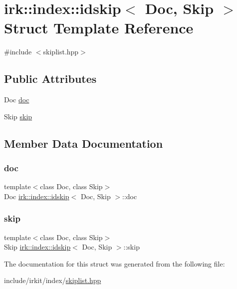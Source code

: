 \hypertarget{structirk_1_1index_1_1idskip}{}\section{irk\+:\+:index\+:\+:idskip$<$ Doc, Skip $>$ Struct Template Reference}
\label{structirk_1_1index_1_1idskip}


{\ttfamily \#include $<$skiplist.\+hpp$>$}

\subsection*{Public Attributes}
\begin{DoxyCompactItemize}
\item 
Doc \mbox{\hyperlink{structirk_1_1index_1_1idskip_a542b096732c3ea92c2d52397b3a00190}{doc}}
\item 
Skip \mbox{\hyperlink{structirk_1_1index_1_1idskip_a7254f175afe9925dc0aae034b779a4a2}{skip}}
\end{DoxyCompactItemize}


\subsection{Member Data Documentation}
\mbox{\label{structirk_1_1index_1_1idskip_a542b096732c3ea92c2d52397b3a00190}} 
\subsubsection{\texorpdfstring{doc}{doc}}
{\footnotesize\ttfamily template$<$class Doc, class Skip$>$ \\
Doc \mbox{\hyperlink{structirk_1_1index_1_1idskip}{irk\+::index\+::idskip}}$<$ Doc, Skip $>$\+::doc}

\mbox{\label{structirk_1_1index_1_1idskip_a7254f175afe9925dc0aae034b779a4a2}} 
\subsubsection{\texorpdfstring{skip}{skip}}
{\footnotesize\ttfamily template$<$class Doc, class Skip$>$ \\
Skip \mbox{\hyperlink{structirk_1_1index_1_1idskip}{irk\+::index\+::idskip}}$<$ Doc, Skip $>$\+::skip}



The documentation for this struct was generated from the following file\+:\begin{DoxyCompactItemize}
\item 
include/irkit/index/\mbox{\hyperlink{skiplist_8hpp}{skiplist.\+hpp}}\end{DoxyCompactItemize}
